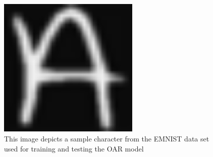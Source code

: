 \documentclass[12pt, titlepage]{article}
\begin{document}
\begin{figure}[h!]
  \begin{center}
    \includegraphics[width=0.6\textwidth]{trainA}
  \caption{This image depicts a sample character from the EMNIST data set used for training and testing the OAR model \citep{EMNIST}}
  \label{Fig_trainA} 
  \end{center}
  \end{figure}
\end{document}
